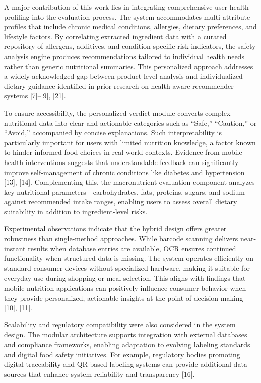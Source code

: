 \documentclass[conference]{IEEEtran}
\begin{document}
A major contribution of this work lies in integrating comprehensive user health profiling into the evaluation process. The system accommodates multi-attribute profiles that include chronic medical conditions, allergies, dietary preferences, and lifestyle factors. By correlating extracted ingredient data with a curated repository of allergens, additives, and condition-specific risk indicators, the safety analysis engine produces recommendations tailored to individual health needs rather than generic nutritional summaries. This personalized approach addresses a widely acknowledged gap between product-level analysis and individualized dietary guidance identified in prior research on health-aware recommender systems [7]–[9], [21].

To ensure accessibility, the personalized verdict module converts complex nutritional data into clear and actionable categories such as “Safe,” “Caution,” or “Avoid,” accompanied by concise explanations. Such interpretability is particularly important for users with limited nutrition knowledge, a factor known to hinder informed food choices in real-world contexts. Evidence from mobile health interventions suggests that understandable feedback can significantly improve self-management of chronic conditions like diabetes and hypertension [13], [14]. Complementing this, the macronutrient evaluation component analyzes key nutritional parameters—carbohydrates, fats, proteins, sugars, and sodium—against recommended intake ranges, enabling users to assess overall dietary suitability in addition to ingredient-level risks.

Experimental observations indicate that the hybrid design offers greater robustness than single-method approaches. While barcode scanning delivers near-instant results when database entries are available, OCR ensures continued functionality when structured data is missing. The system operates efficiently on standard consumer devices without specialized hardware, making it suitable for everyday use during shopping or meal selection. This aligns with findings that mobile nutrition applications can positively influence consumer behavior when they provide personalized, actionable insights at the point of decision-making [10], [11].

Scalability and regulatory compatibility were also considered in the system design. The modular architecture supports integration with external databases and compliance frameworks, enabling adaptation to evolving labeling standards and digital food safety initiatives. For example, regulatory bodies promoting digital traceability and QR-based labeling systems can provide additional data sources that enhance system reliability and transparency [16].
\end{document}
